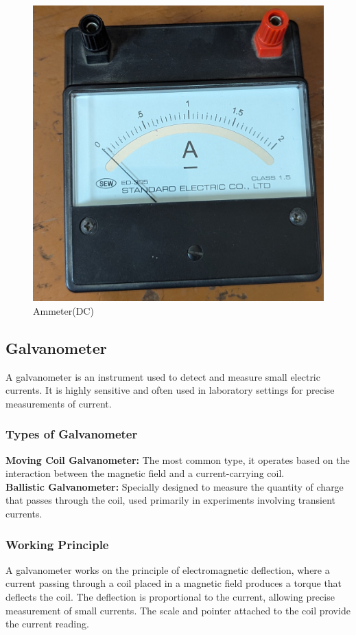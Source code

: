 \documentclass[a4paper,12pt]{article}
\begin{document}
\begin{figure}[H]
	\centering
	\includegraphics[width=0.42\linewidth]{Images/2}
	\caption{Ammeter(DC)}
	\label{fig:2}
\end{figure}
	
\subsection{Galvanometer}
A galvanometer is an instrument used to detect and measure small electric currents. It is highly sensitive and often used in laboratory settings for precise measurements of current.

\subsubsection{Types of Galvanometer}
\textbf{Moving Coil Galvanometer:} The most common type, it operates based on the interaction between the magnetic field and a current-carrying coil.\\
\textbf{Ballistic Galvanometer:} Specially designed to measure the quantity of charge that passes through the coil, used primarily in experiments involving transient currents.

\subsubsection{Working Principle}
A galvanometer works on the principle of electromagnetic deflection, where a current passing through a coil placed in a magnetic field produces a torque that deflects the coil. The deflection is proportional to the current, allowing precise measurement of small currents. The scale and pointer attached to the coil provide the current reading.
\end{document}
